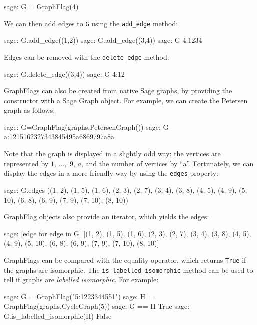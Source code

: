 \documentclass{article}
\begin{document}
\begin{sage}
sage: G = GraphFlag(4)
\end{sage}

We can then add edges to \verb|G| using the \verb|add_edge| method:

\begin{sage}
sage: G.add_edge((1,2))
sage: G.add_edge((3,4))
sage: G
4:1234
\end{sage}

Edges can be removed with the \verb|delete_edge| method:

\begin{sage}
sage: G.delete_edge((3,4))
sage: G
4:12
\end{sage}

GraphFlags can also be created from native Sage graphs, by providing the constructor with a Sage Graph object. For example, we can create the Petersen graph as follows:

\begin{sage}
sage: G=GraphFlag(graphs.PetersenGraph())
sage: G
a:1215162327343845495a6869797a8a
\end{sage}

Note that the graph is displayed in a slightly odd way: the vertices are represented by $1$, $\dots,$ $9$, $a$, and the number of vertices by ``a''. Fortunately, we can display the edges in a more friendly way by using the \verb|edges| property:

\begin{sage}
sage: G.edges
((1, 2), (1, 5), (1, 6), (2, 3), (2, 7), (3, 4), (3, 8), (4, 5), (4, 9),
(5, 10), (6, 8), (6, 9), (7, 9), (7, 10), (8, 10))
\end{sage}

GraphFlag objects also provide an iterator, which yields the edges:

\begin{sage}
sage: [edge for edge in G]
[(1, 2), (1, 5), (1, 6), (2, 3), (2, 7), (3, 4), (3, 8), (4, 5), (4, 9),
(5, 10), (6, 8), (6, 9), (7, 9), (7, 10), (8, 10)]
\end{sage}

GraphFlags can be compared with the equality operator, which returns \verb|True| if the graphs are isomorphic. The \verb|is_labelled_isomorphic| method can be used to tell if graphs are \emph{labelled isomorphic}. For example:

\begin{sage}
sage: G = GraphFlag("5:1223344551")
sage: H = GraphFlag(graphs.CycleGraph(5))
sage: G == H
True
sage: G.is_labelled_isomorphic(H)
False
\end{sage}
\end{document}
